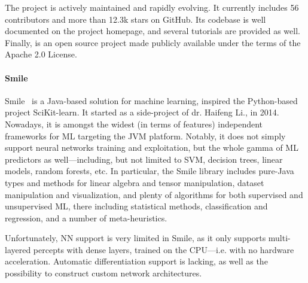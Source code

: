 \documentclass[12pt,a4paper,openright,twoside]{book}
\begin{document}
The project is actively maintained and rapidly evolving.
%
It currently includes 56 contributors and more than 12.3k stars on GitHub.
%
Its codebase is well documented on the project homepage, and several tutorials are provided as well.
%
Finally, \dlfj{} is an open source project made publicly available under the terms of the Apache 2.0 License.


\paragraph{Smile}

Smile~\cite{SmileHomepage} is a Java-based solution for machine learning, inspired the Python-based project SciKit-learn.
%
It started as a side-project of dr. Haifeng Li., in 2014.
%
Nowadays, it is amongst the widest (in terms of features) independent frameworks for ML targeting the JVM platform.
%
Notably, it does not simply support neural networks training and exploitation, but the whole gamma of ML predictors as well---including, but not limited to SVM, decision trees, linear models, random forests, etc.
In particular, the Smile library includes pure-Java types and methods for linear algebra and tensor manipulation, dataset manipulation and visualization, and plenty of algorithms for both supervised and unsupervised ML, there including statistical methods, classification and regression, and a number of meta-heuristics.

Unfortunately, NN support is very limited in Smile, as it only supports multi-layered percepts with dense layers, trained on the CPU---i.e. with no hardware acceleration.
%
Automatic differentiation support is lacking, as well as the possibility to construct custom network architectures.
%
\end{document}
